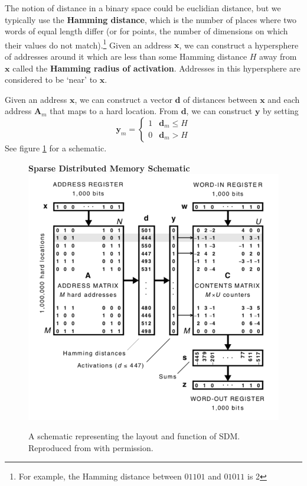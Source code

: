\documentclass[journal, onecolumn, 12pt, draftclsnofoot]{IEEEtran}
\newcommand{\kword}[1]{\textbf{#1}}
\newcommand{\mbf}[1]{\mathbf{#1}}
\begin{document}
	\par The notion of distance in a binary space could be euclidian distance, but we typically use the \kword{Hamming distance}, which is the number of places where two words of equal length differ (or for points, the number of dimensions on which their values do not match).\footnote{For example, the Hamming distance between $01101$ and $01011$ is 2} Given an address $\mbf{x}$, we can construct a hypersphere of addresses around it which are less than some Hamming distance $H$ away from $\mbf{x}$ called the \kword{Hamming radius of activation}. Addresses in this hypersphere are considered to be `near' to $\mbf{x}$.
	\par Given an address $\mbf{x}$, we can construct a vector $\mbf{d}$ of distances between $\mbf{x}$ and each address $\mbf{A}_m$ that maps to a hard location. From $\mbf{d}$, we can construct $\mbf{y}$ by setting
	\begin{equation}
		\mbf{y}_m = \begin{cases}
								1 & \mbf{d}_m \leq H \\
								0 & \mbf{d}_m > H
								\end{cases}
	\end{equation}
	See figure \ref{fig:SDM} for a schematic.
	\begin{figure}[ht]
		\begin{center}
			\textbf{Sparse Distributed Memory Schematic} \\
		\includegraphics[scale=0.5]{fig/SDM.png}
	\end{center}
		\caption{A schematic representing the layout and function of SDM. Reproduced from \cite{sdm} with permission.}
		\label{fig:SDM}
	\end{figure}
\end{document}

